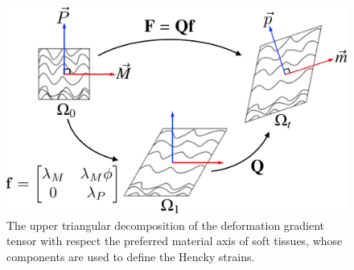     
\begin{figure}
\centering
\includegraphics[width=5in]{Figures/henckykinematics}
\caption{The upper triangular decomposition of the deformation gradient tensor with respect the preferred material axis of soft tissues, whose components are used to define the Hencky strains.}
\label{fig:henckykinematics}
\end{figure}
    
